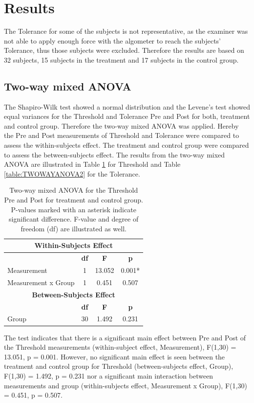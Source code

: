 \section{Results}
The Tolerance for some of the subjects is not representative, as the examiner was not able to apply enough force with the algometer to reach the subjects' Tolerance, thus those subjects were excluded. 
Therefore the results are based on 32 subjects, 15 subjects in the treatment and 17 subjects in the control group. 

\subsection{Two-way mixed ANOVA}
The Shapiro-Wilk test showed a normal distribution and the Levene's test showed equal variances for the Threshold and Tolerance Pre and Post for both, treatment and control group. Therefore the two-way mixed ANOVA was applied. Hereby the Pre and Post measurements of Threshold and Tolerance were compared to assess the within-subjects effect. The treatment and control group were compared to assess the between-subjects effect. The results from the two-way mixed ANOVA are illustrated in Table \ref{table:TWOWAYANOVA1} for Threshold and Table \ref{table:TWOWAYANOVA2} for the Tolerance. 

\begin{table}[ht]
\caption{Two-way mixed ANOVA for the Threshold Pre and Post for treatment and control group. P-values marked with an asterisk indicate significant difference. F-value and degree of freedom (df) are illustrated as well.}
\centering
\begin{tabular}{l c c c}
\toprule
\multicolumn{4}{c}{\textbf{Within-Subjects Effect}} \\
\midrule
& \textbf{df} &\textbf{F} & \textbf{p} \\ [0.5ex] %
Measurement & 1 & 13.052 &  0.001* \\
Measurement x Group & 1 & 0.451 & 0.507 \\
\toprule
\multicolumn{4}{c}{\textbf{Between-Subjects Effect}} \\
\midrule 
& \textbf{df} & \textbf{F} & \textbf{p} \\ [0.5ex] %
Group & 30 & 1.492 &  0.231 \\
\hline
\end{tabular}
\label{table:TWOWAYANOVA1}
\end{table}

The test indicates that there is a significant main effect between Pre and Post of the Threshold measurements (within-subject effect, Measurement), F(1,30) = 13.051, p = 0.001. However, no significant main effect is seen between the treatment and control group for Threshold (between-subjects effect, Group), F(1,30) = 1.492, p = 0.231 nor a significant main interaction between measurements and group (within-subjects effect, Measurement x Group), F(1,30) = 0.451, p = 0.507. 

